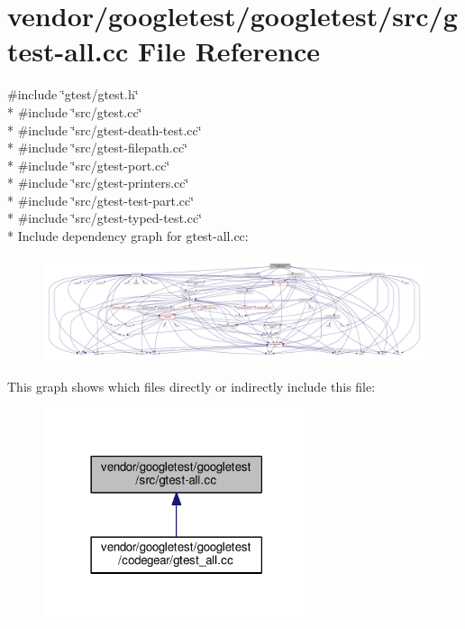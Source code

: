 \hypertarget{gtest-all_8cc}{}\section{vendor/googletest/googletest/src/gtest-\/all.cc File Reference}
\label{gtest-all_8cc}
{\ttfamily \#include \char`\"{}gtest/gtest.\+h\char`\"{}}\\*
{\ttfamily \#include \char`\"{}src/gtest.\+cc\char`\"{}}\\*
{\ttfamily \#include \char`\"{}src/gtest-\/death-\/test.\+cc\char`\"{}}\\*
{\ttfamily \#include \char`\"{}src/gtest-\/filepath.\+cc\char`\"{}}\\*
{\ttfamily \#include \char`\"{}src/gtest-\/port.\+cc\char`\"{}}\\*
{\ttfamily \#include \char`\"{}src/gtest-\/printers.\+cc\char`\"{}}\\*
{\ttfamily \#include \char`\"{}src/gtest-\/test-\/part.\+cc\char`\"{}}\\*
{\ttfamily \#include \char`\"{}src/gtest-\/typed-\/test.\+cc\char`\"{}}\\*
Include dependency graph for gtest-\/all.cc\+:
\nopagebreak
\begin{figure}[H]
\begin{center}
\leavevmode
\includegraphics[width=350pt]{gtest-all_8cc__incl}
\end{center}
\end{figure}
This graph shows which files directly or indirectly include this file\+:
\nopagebreak
\begin{figure}[H]
\begin{center}
\leavevmode
\includegraphics[width=222pt]{gtest-all_8cc__dep__incl}
\end{center}
\end{figure}
